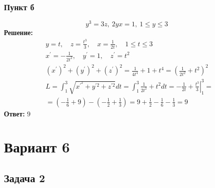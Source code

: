 \subsubsection*{Пункт б}
$$y^3 = 3z, ~ 2yx = 1, ~ 1 \leq y \leq 3$$
\textbf{Решение:} \\
$$
\begin{aligned}
& y=t, \quad z=\frac{t^3}{3}, \quad x=\frac{1}{2 t}, \quad 1 \leq t \leq 3 \\
& x^{\prime}=-\frac{1}{2 t^2}, \quad y^{\prime}=1, \quad z^{\prime}=t^2 \\
& \left(x^{\prime}\right)^2+\left(y^{\prime}\right)^2+\left(z^{\prime}\right)^2=\frac{1}{4 t^4}+1+t^4=\left(\frac{1}{2 t^2}+t^2\right)^2 \\
& L=\int_1^3 \sqrt{x^{\prime^2}+y^{\prime 2}+z^{\prime 2}} d t=\int_1^3 \frac{1}{2 t^2}+t^2 d t=-\frac{1}{2 t}+\left.\frac{t^3}{3}\right|_1 ^3= \\
& =\left(-\frac{1}{6}+9\right)-\left(-\frac{1}{2}+\frac{1}{3}\right)=9+\frac{1}{2}-\frac{1}{6}-\frac{1}{3}=9 \qquad 
\end{aligned}
$$
\textbf{Ответ:} $9$ \newpage
\section*{Вариант 6}
\subsection*{Задача 2}
